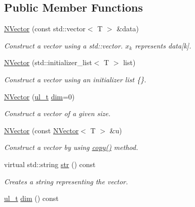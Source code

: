 \subsection*{Public Member Functions}
\begin{DoxyCompactItemize}
\item 
\mbox{\hyperlink{class_n_vector_a786957fb5d1d9bdec7e6ced65bce03c0}{N\+Vector}} (const std\+::vector$<$ T $>$ \&data)
\begin{DoxyCompactList}\small\item\em Construct a vector using a {\ttfamily std\+::vector}. $ x_k $ represents {\ttfamily data\mbox{[}k\mbox{]}}. \end{DoxyCompactList}\item 
\mbox{\hyperlink{class_n_vector_a44c7b132c668c2aac890b66fe7ab0262}{N\+Vector}} (std\+::initializer\+\_\+list$<$ T $>$ list)
\begin{DoxyCompactList}\small\item\em Construct a vector using an initializer list {\ttfamily \{\}}. \end{DoxyCompactList}\item 
\mbox{\hyperlink{class_n_vector_a58eee5f012e4e563d477788051fc7f1d}{N\+Vector}} (\mbox{\hyperlink{group___n_algebra_ga1b140a2034db3f5dfe18a987745df43a}{ul\+\_\+t}} \mbox{\hyperlink{class_n_vector_a7589027db20509ac4d93490bb9a1979a}{dim}}=0)
\begin{DoxyCompactList}\small\item\em Construct a vector of a given size. \end{DoxyCompactList}\item 
\mbox{\hyperlink{class_n_vector_a7f648402b0fc9006ce9ced7ca647e600}{N\+Vector}} (const \mbox{\hyperlink{class_n_vector}{N\+Vector}}$<$ T $>$ \&u)
\begin{DoxyCompactList}\small\item\em Construct a vector by using {\ttfamily \mbox{\hyperlink{class_n_vector_a67128d2ff536b8ccd7a95cb680bd0431}{copy()}}} method. \end{DoxyCompactList}\item 
virtual std\+::string \mbox{\hyperlink{class_n_vector_a6d66b06b953197c1b3965ed69f9fd17e}{str}} () const
\begin{DoxyCompactList}\small\item\em Creates a string representing the vector. \end{DoxyCompactList}\item 
\mbox{\hyperlink{group___n_algebra_ga1b140a2034db3f5dfe18a987745df43a}{ul\+\_\+t}} \mbox{\hyperlink{class_n_vector_a7589027db20509ac4d93490bb9a1979a}{dim}} () const

\end{DoxyCompactItemize}
